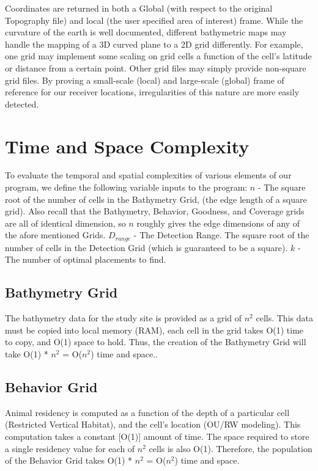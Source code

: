 Coordinates are returned in both a Global (with respect to the original Topography file) and local (the user specified area of interest) frame.  While the curvature of the earth is well documented, different bathymetric maps may handle the mapping of a 3D curved plane to a 2D grid differently.  For example, one grid may implement some scaling on grid cells a function of the cell's latitude or distance from a certain point.  Other grid files may simply provide non-square grid files.  By proving a small-scale (local) and large-scale (global) frame of reference for our receiver locations, irregularities of this nature are more easily detected.


\section{Time and Space Complexity}
\label{computationalComplexity}
To evaluate the temporal and spatial complexities of various elements of our program, we define the following variable inputs to the program:\newline
$n$ - The square root of the number of cells in the Bathymetry Grid, (the edge length of a square grid).  Also recall that the Bathymetry, Behavior, Goodness, and Coverage grids are all of identical dimension, so $n$ roughly gives the edge dimensions of any of the afore mentioned Grids.\newline
$D_{range}$ - The Detection Range.  The square root of the number of cells in the Detection Grid (which is guaranteed to be a square).\newline
$k$ - The number of optimal placements to find.\newline

\subsection{Bathymetry Grid}
The bathymetry data for the study site is provided as a grid of $n^2$ cells.  This data must be copied into local memory (RAM), each cell in the grid takes O(1) time to copy, and O(1) space to hold.  Thus, the creation of the Bathymetry Grid will take O(1) * $n^2$ = O($n^2$) time and space..

\subsection{Behavior Grid}
Animal residency is computed as a function of the depth of a particular cell (Restricted Vertical Habitat), and the cell's location (OU/RW modeling).  This computation takes a constant [O(1)] amount of time.  The space required to store a single residency value for each of $n^2$ cells is also O(1).  Therefore, the population of the Behavior Grid takes O(1) * $n^2$ = O($n^2$) time and space.


